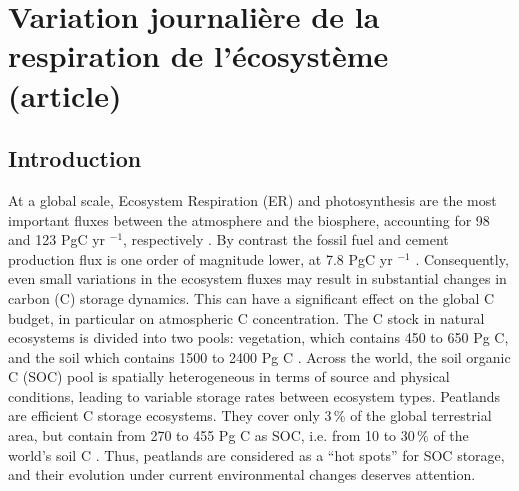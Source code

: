 \chapter{Variation journalière de la respiration de l'écosystème (article)}

\minitoc

\newpage

\section{Introduction}
At a global scale, Ecosystem Respiration (ER) and photosynthesis are the most important fluxes between the atmosphere and the biosphere, accounting for 98 and 123 PgC yr $^{-1}$, respectively \citep{Bond-Lamberty2010,Beer2010}. 
By contrast the fossil fuel and cement production flux is one order of magnitude lower, at 7.8 PgC yr $^{-1}$ \citep{Ciais2014}.
Consequently, even small variations in the ecosystem fluxes may result in substantial changes in carbon (C) storage dynamics.
This can have a significant effect on the global C budget, in particular on atmospheric C concentration.
The C stock in natural ecosystems is divided into two pools: vegetation, which contains 450 to 650 Pg C, and the soil which contains 1500 to 2400 Pg C \citep{prentice2001,Eswaran1993,batjes1996}.
Across the world, the soil organic C (SOC) pool is spatially heterogeneous in terms of source and physical conditions, leading to variable storage rates between ecosystem types.
Peatlands are efficient C storage ecosystems.
They cover only 3\,\% of the global terrestrial area, but contain from 270 to 455 Pg C as SOC, i.e. from 10 to 30\,\% of the world's soil C \citep{gorham1991, turunen2002}.
Thus, peatlands are considered as a “hot spots” for SOC storage, and their evolution under current environmental changes deserves attention.

